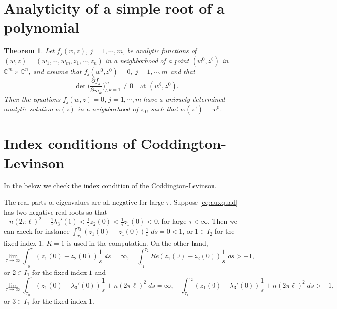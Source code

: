 \documentclass[a4paper,11pt]{article}
\def\l{(2\pi \ell)}
\newtheorem{theorem}{Theorem}
\theoremstyle{remark}
\begin{document}
\section{Analyticity of a simple root of a polynomial}



\begin{theorem}{\cite[p. 24]{L1966}} \label{thm:anal} Let $f_j(w,z)$, $j=1,\cdots,m$, be analytic functions of $(w,z)=(w_1,\cdots,w_m,z_1,\cdots,z_n)$ in a neighborhood of a point $(w^0,z^0)$ in $\mathbb{C}^m\times \mathbb{C}^n$, and assume that $f_j(w^0,z^0)=0$, $j=1,\cdots,m$ and that
$$ \det\Big( \frac{\partial f_j}{\partial w_k} \Big)_{j,k=1}^m \ne 0 \quad \text{at $(w^0,z^0)$}.$$
Then the equations $f_j(w,z)=0$, $j=1,\cdots,m$ have a uniquely determined analytic solution $w(z)$ in a neighborhood of $z_0$, such that $w(z^0)=w^0$.
\end{theorem}

\section{Index conditions of Coddington-Levinson} \label{sec:Index}

In the below we check the index condition of the Coddington-Levinson.

 The real parts of eigenvalues are all negative for large $\tau$. Suppose \eqref{eq:auxquad} has two negative real roots so that  $-n\l^2 + \frac{1}{\tau}\lambda_3'(0)<\frac{1}{\tau}z_2(0)<\frac{1}{\tau}z_1(0)<0$, for large $\tau<\infty$.  Then we can check for instance
$\displaystyle\int_{\tau_1}^{\tau_2} (z_1(0)-z_1(0))\frac{1}{s} \; ds = 0< 1$,
or $1\in I_2$ for the fixed index $1$. $K=1$ is used in the computation. On the other hand,
$$ \lim_{\tau \rightarrow \infty}\int_{\tau_0}^\tau (z_1(0)-z_2(0))\frac{1}{s} \; ds = \infty, \quad  \int_{\tau_1}^{\tau_2} Re (z_1(0)-z_2(0))\frac{1}{s} \; ds > -1,$$
or $2\in I_1$ for the fixed index $1$ and
$$ \lim_{\tau \rightarrow \infty}\int_{\tau_0}^\tau (z_1(0)-\lambda_3'(0))\frac{1}{s} + n\l^2 \; ds =\infty, \quad  \int_{\tau_1}^{\tau_2} (z_1(0)-\lambda_3'(0))\frac{1}{s} + n\l^2 \; ds > -1,$$
or $3\in I_1$ for the fixed index $1$.
\end{document}
